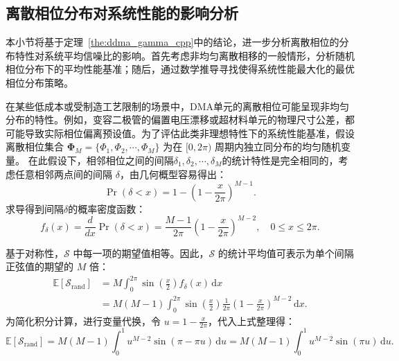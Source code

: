 \subsection{离散相位分布对系统性能的影响分析}

本小节将基于定理~\ref{the:ddma_gamma_cpp}中的结论，进一步分析离散相位的分布特性对系统平均信噪比的影响。首先考虑非均匀离散相移的一般情形，分析随机相位分布下的平均性能基准；随后，通过数学推导寻找使得系统性能最大化的最优相位分布策略。

在某些低成本或受制造工艺限制的场景中，DMA单元的离散相位可能呈现非均匀分布的特性。例如，变容二极管的偏置电压漂移或超材料单元的物理尺寸公差，都可能导致实际相位偏离预设值。为了评估此类非理想特性下的系统性能基准，假设离散相位集合 $\bm \Phi_M = \{\Phi_1, \Phi_2, \cdots, \Phi_M\}$ 为在 $[0, 2\pi)$ 周期内独立同分布的均匀随机变量。
在此假设下，相邻相位之间的间隔$\delta_1,\delta_2,\cdots,\delta_M$的统计特性是完全相同的，考虑任意相邻两点间的间隔 $\delta$，由几何概型容易得出：
\begin{equation}
	\operatorname{Pr}(\delta < x) = 1-\left( 1 - \frac{x}{2\pi} \right)^{M-1}.
\end{equation}
求导得到间隔$\delta$的概率密度函数：
\begin{equation}
	f_\delta(x) = \frac{d}{dx} \operatorname{Pr}(\delta < x) = \frac{M-1}{2\pi} \left( 1 - \frac{x}{2\pi} \right)^{M-2}, \quad 0 \le x \le 2\pi.
\end{equation}

基于对称性，$\mathcal{S}$ 中每一项的期望值相等。因此，$\mathcal{S}$ 的统计平均值可表示为单个间隔正弦值的期望的 $M$ 倍：
\begin{align}
	\mathbb{E}[\mathcal{S}_{\text{rand}}] 
	&= M \int_0^{2\pi} \sin\left(\frac{x}{2}\right) f_\delta(x) \, \mathrm{d}x \nonumber \\
	&= M(M-1) \int_0^{2\pi} \sin\left(\frac{x}{2}\right) \frac{1}{2\pi} \left(1-\frac{x}{2\pi}\right)^{M-2} \, \mathrm{d}x.
\end{align}
为简化积分计算，进行变量代换，令 $u = 1 - \frac{x}{2\pi}$，代入上式整理得：
\begin{equation}\label{eq:ddma_random_phase_expect}
	\mathbb{E}[\mathcal{S}_{\text{rand}}] = M(M-1) \int_0^1 u^{M-2} \sin(\pi - \pi u) \, \mathrm{d}u = M(M-1) \int_0^1 u^{M-2} \sin(\pi u) \, \mathrm{d}u.
\end{equation}

